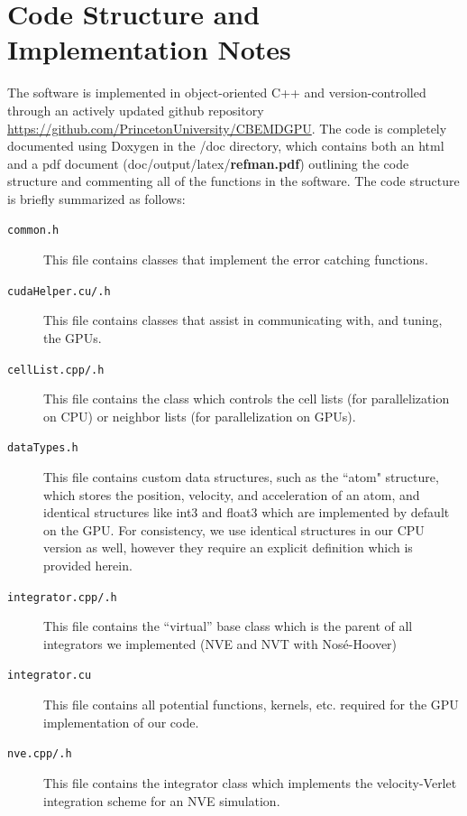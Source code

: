 \documentclass[12pt]{article}
\begin{document}
\section{Code Structure and Implementation Notes}

The software is implemented in object-oriented C++ and version-controlled through an actively updated github repository \url{https://github.com/PrincetonUniversity/CBEMDGPU}. The code is completely documented using Doxygen in the /doc directory, which contains both an html and a pdf document (doc/output/latex/\textbf{refman.pdf}) outlining the code structure and commenting all of the functions in the software.
%
The code structure is briefly summarized as follows:
\begin{description}

\item[\texttt{common.h}] This file contains classes that implement the error catching functions.

\item[\texttt{cudaHelper.cu/.h}] This file contains classes that assist in communicating with, and tuning, the GPUs.

\item[\texttt{cellList.cpp/.h}] This file contains the class which controls the cell lists (for parallelization on CPU) or neighbor lists (for parallelization on GPUs).

\item[\texttt{dataTypes.h}] This file contains custom data structures, such as the ``atom" structure, which stores the position, velocity, and acceleration of an atom, and identical structures like int3 and float3 which are implemented by default on the GPU.  For consistency, we use identical structures in our CPU version as well, however they require an explicit definition which is provided herein.
	
\item[\texttt{integrator.cpp/.h}] This file contains the ``virtual'' base class which is the parent of all integrators we implemented (NVE and NVT with Nos\'{e}-Hoover)

\item[\texttt{integrator.cu}] This file contains all potential functions, kernels, etc. required for the GPU implementation of our code.

\item[\texttt{nve.cpp/.h}] This file contains the integrator class which implements the velocity-Verlet integration scheme for an NVE simulation.


\end{description}
\end{document}
